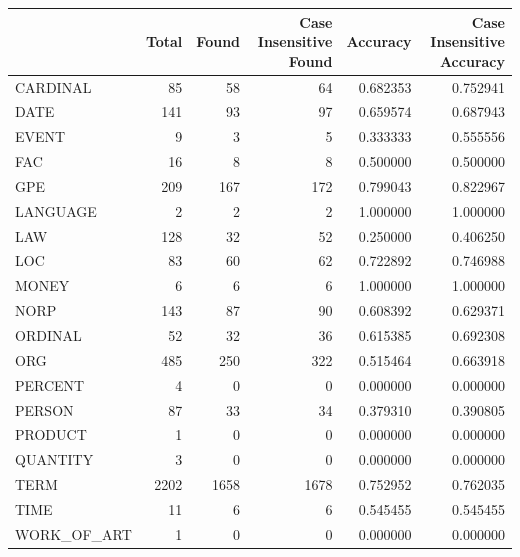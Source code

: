 \begin{tabular}{lrrrrr}
\toprule
 & Total & Found & Case Insensitive Found & Accuracy & Case Insensitive Accuracy \\
\midrule
CARDINAL & 85 & 58 & 64 & 0.682353 & 0.752941 \\
DATE & 141 & 93 & 97 & 0.659574 & 0.687943 \\
EVENT & 9 & 3 & 5 & 0.333333 & 0.555556 \\
FAC & 16 & 8 & 8 & 0.500000 & 0.500000 \\
GPE & 209 & 167 & 172 & 0.799043 & 0.822967 \\
LANGUAGE & 2 & 2 & 2 & 1.000000 & 1.000000 \\
LAW & 128 & 32 & 52 & 0.250000 & 0.406250 \\
LOC & 83 & 60 & 62 & 0.722892 & 0.746988 \\
MONEY & 6 & 6 & 6 & 1.000000 & 1.000000 \\
NORP & 143 & 87 & 90 & 0.608392 & 0.629371 \\
ORDINAL & 52 & 32 & 36 & 0.615385 & 0.692308 \\
ORG & 485 & 250 & 322 & 0.515464 & 0.663918 \\
PERCENT & 4 & 0 & 0 & 0.000000 & 0.000000 \\
PERSON & 87 & 33 & 34 & 0.379310 & 0.390805 \\
PRODUCT & 1 & 0 & 0 & 0.000000 & 0.000000 \\
QUANTITY & 3 & 0 & 0 & 0.000000 & 0.000000 \\
TERM & 2202 & 1658 & 1678 & 0.752952 & 0.762035 \\
TIME & 11 & 6 & 6 & 0.545455 & 0.545455 \\
WORK_OF_ART & 1 & 0 & 0 & 0.000000 & 0.000000 \\
\bottomrule
\end{tabular}
